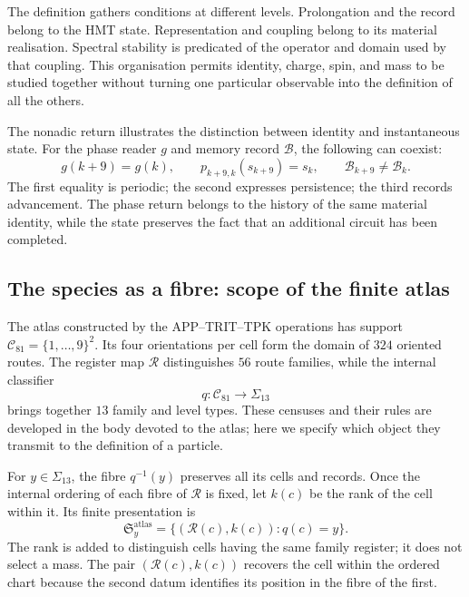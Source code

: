 The definition gathers conditions at different levels. Prolongation
and the record belong to the HMT state. Representation and
coupling belong to its material realisation. Spectral
stability is predicated of the operator and domain used by that
coupling. This organisation permits identity,
charge, spin, and mass to be studied together without turning one particular observable into the definition
of all the others.

The nonadic return illustrates the distinction between identity and instantaneous
state. For the phase reader $g$ and memory record
$\mathcal B$, the following can coexist:
\begin{equation}
 g(k+9)=g(k),\qquad
 p_{k+9,k}(s_{k+9})=s_k,\qquad
 \mathcal B_{k+9}\ne\mathcal B_k.
 \label{vi:vi:eq:persistencia-fase-memoria}
\end{equation}
The first equality is periodic; the second expresses persistence; the
third records advancement. The phase return belongs to the history
of the same material identity, while the state preserves the fact that
an additional circuit has been completed.

\subsection{The species as a fibre: scope of the finite atlas}
\label{vi:vi:subsec:especie-fibra}

The atlas constructed by the APP--TRIT--TPK operations has support
$\mathcal C_{81}=\{1,\ldots,9\}^2$. Its four orientations per
cell form the domain of $324$ oriented routes. The register
map $\mathcal R$ distinguishes $56$ route families, while the
internal classifier
\begin{equation}
 q:\mathcal C_{81}\longrightarrow\Sigma_{13}
 \label{vi:vi:eq:clasificador-especies}
\end{equation}
brings together $13$ family and level types. These censuses and their rules are
developed in the body devoted to the atlas; here we specify which object
they transmit to the definition of a particle.

For $y\in\Sigma_{13}$, the fibre $q^{-1}(y)$ preserves all its
cells and records. Once the internal ordering of each fibre of
$\mathcal R$ is fixed, let $k(c)$ be the rank of the cell within it. Its
finite presentation is
\begin{equation}
 \mathfrak S_y^{\mathrm{atlas}}
 =\{(\mathcal R(c),k(c)):q(c)=y\}.
 \label{vi:vi:eq:multiseccion-atlas}
\end{equation}
The rank is added to distinguish cells having the same family
register; it does not select a mass. The pair $(\mathcal R(c),k(c))$
recovers the cell within the ordered chart because the second datum
identifies its position in the fibre of the first.

